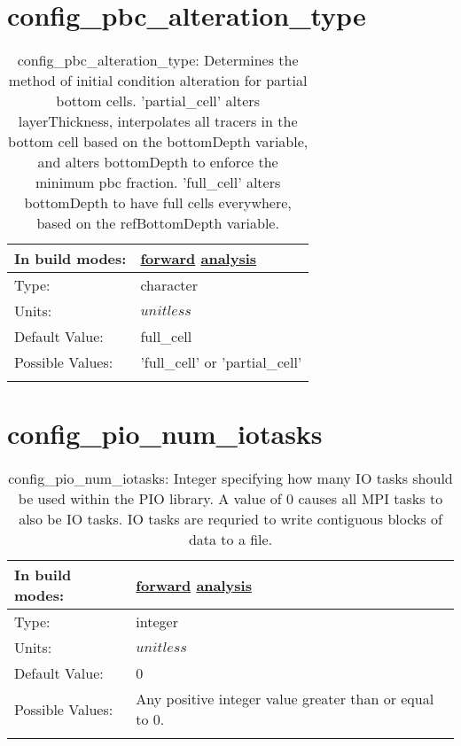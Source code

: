 \section[config\_pbc\_alteration\_type]{config\_pbc\_alteration\_type}
\label{sec:nm_sec_config_pbc_alteration_type}
\begin{center}
\begin{longtable}{| p{2.0in} || p{4.0in} |}
    \hline
    In build modes: & \hyperref[subsec:forward_nm_tab_partial_bottom_cells]{forward} \hyperref[subsec:analysis_nm_tab_partial_bottom_cells]{analysis} \\
    \hline
    Type: & character \\
    \hline
    Units: & $unitless$ \\
    \hline
    Default Value: & full\_cell \\
    \hline
    Possible Values: & 'full\_cell' or 'partial\_cell' \\
    \hline
    \caption{config\_pbc\_alteration\_type: Determines the method of initial condition alteration for partial bottom cells. 'partial\_cell' alters layerThickness, interpolates all tracers in the bottom cell based on the bottomDepth variable, and alters bottomDepth to enforce the minimum pbc fraction. 'full\_cell' alters bottomDepth to have full cells everywhere, based on the refBottomDepth variable.}
\end{longtable}
\end{center}
\section[config\_pio\_num\_iotasks]{config\_pio\_num\_iotasks}
\label{sec:nm_sec_config_pio_num_iotasks}
\begin{center}
\begin{longtable}{| p{2.0in} || p{4.0in} |}
    \hline
    In build modes: & \hyperref[subsec:forward_nm_tab_io]{forward} \hyperref[subsec:analysis_nm_tab_io]{analysis} \\
    \hline
    Type: & integer \\
    \hline
    Units: & $unitless$ \\
    \hline
    Default Value: & 0 \\
    \hline
    Possible Values: & Any positive integer value greater than or equal to 0. \\
    \hline
    \caption{config\_pio\_num\_iotasks: Integer specifying how many IO tasks should be used within the PIO library. A value of 0 causes all MPI tasks to also be IO tasks. IO tasks are requried to write contiguous blocks of data to a file.}
\end{longtable}
\end{center}

